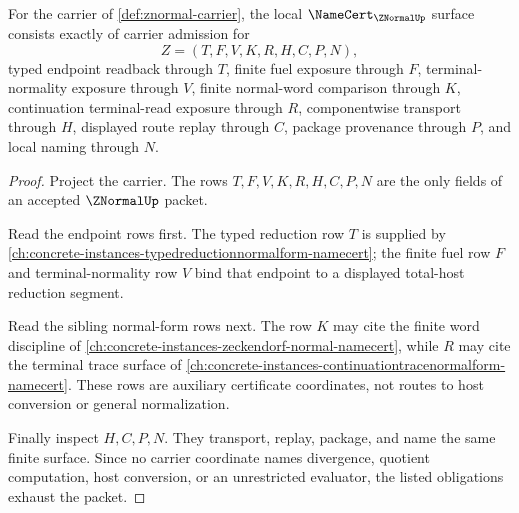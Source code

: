 \begin{theorem}
\label{thm:znormal-namecert-obligations}
For the carrier of \autoref{def:znormal-carrier}, the local $\NameCert_{\ZNormalUp}$ surface consists exactly of carrier admission for
$$
Z=(T,F,V,K,R,H,C,P,N),
$$
typed endpoint readback through $T$, finite fuel exposure through $F$, terminal-normality exposure through $V$, finite normal-word comparison through $K$, continuation terminal-read exposure through $R$, componentwise transport through $H$, displayed route replay through $C$, package provenance through $P$, and local naming through $N$.
\end{theorem}
\begin{proof}
Project the carrier. The rows $T,F,V,K,R,H,C,P,N$ are the only fields of an accepted $\ZNormalUp$ packet.

Read the endpoint rows first. The typed reduction row $T$ is supplied by \autoref{ch:concrete-instances-typedreductionnormalform-namecert}; the finite fuel row $F$ and terminal-normality row $V$ bind that endpoint to a displayed total-host reduction segment.

Read the sibling normal-form rows next. The row $K$ may cite the finite word discipline of \autoref{ch:concrete-instances-zeckendorf-normal-namecert}, while $R$ may cite the terminal trace surface of \autoref{ch:concrete-instances-continuationtracenormalform-namecert}. These rows are auxiliary certificate coordinates, not routes to host conversion or general normalization.

Finally inspect $H,C,P,N$. They transport, replay, package, and name the same finite surface. Since no carrier coordinate names divergence, quotient computation, host conversion, or an unrestricted evaluator, the listed obligations exhaust the packet.
\end{proof}

